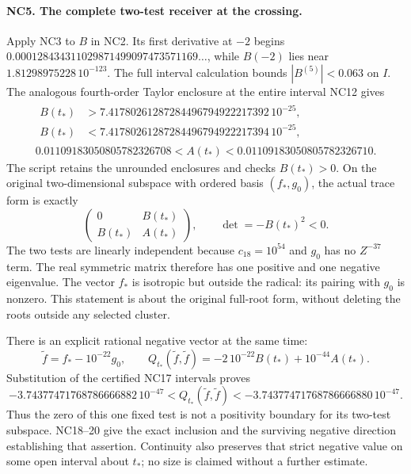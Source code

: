 \documentclass[11pt,a4paper]{article}
\theoremstyle{definition}\newtheorem{definition}[theorem]{Definition}
\newcommand{\B}{\mathbb B}\newcommand{\N}{\mathbb N}
\begin{document}
\paragraph{NC5. The complete two-test receiver at the crossing.}
Apply NC3 to $B$ in NC2. Its first derivative at $-2$ begins
$0.000128434311029871499097473571169\ldots$, while
$B(-2)$ lies near $1.81298975228\,10^{-123}$.
The full interval calculation bounds $|B^{(5)}|<0.063$ on $I$.
The analogous fourth-order Taylor enclosure at the entire interval
NC12 gives
\[
\begin{gathered}
\begin{aligned}
B(t_*)&>7.41780261287284496794922217392\,10^{-25},\\
B(t_*)&<7.41780261287284496794922217394\,10^{-25},
\end{aligned}\\
0.01109183050805782326708<A(t_*)<0.01109183050805782326710.
\end{gathered}\tag{NC17}
\]
The script retains the unrounded enclosures and checks $B(t_*)>0$.
On the original two-dimensional subspace with ordered basis
$(f_*,g_0)$, the actual trace form is exactly
\[
 \begin{pmatrix}0&B(t_*)\\B(t_*)&A(t_*)\end{pmatrix},
 \qquad\det=-B(t_*)^2<0.
 \tag{NC18}
\]
The two tests are linearly independent because $c_{18}=10^{54}$
and $g_0$ has no $Z^{-37}$ term. The real symmetric matrix therefore
has one positive and one negative eigenvalue. The vector $f_*$ is
isotropic but outside the radical: its pairing with $g_0$ is nonzero.
This statement is about the original full-root form, without deleting
the roots outside any selected cluster.

There is an explicit rational negative vector at the same time:
\[
 \widetilde f=f_*-10^{-22}g_0,
 \qquad
 Q_{t_*}(\widetilde f,\widetilde f)
 =-2\,10^{-22}B(t_*)+10^{-44}A(t_*).
 \tag{NC19}
\]
Substitution of the certified NC17 intervals proves
\[
 -3.74377471768786666882\,10^{-47}
 <Q_{t_*}(\widetilde f,\widetilde f)
 <-3.74377471768786666880\,10^{-47}.
 \tag{NC20}
\]
Thus the zero of this one fixed test is not a positivity boundary
for its two-test subspace. NC18--20 give the exact inclusion and
the surviving negative direction establishing that assertion.
Continuity also preserves that strict negative value on some open
interval about $t_*$; no size is claimed without a further estimate.
\end{document}
